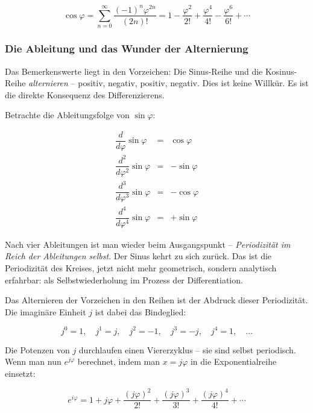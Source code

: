 ﻿\documentclass[a4paper,12pt]{article}
\theoremstyle{definition}
\begin{document}
\begin{equation}
	\cos\varphi = \sum_{n=0}^{\infty} \frac{(-1)^n \varphi^{2n}}{(2n)!}
	= 1 - \frac{\varphi^2}{2!} + \frac{\varphi^4}{4!} - \frac{\varphi^6}{6!} + \cdots
\end{equation}

\subsubsection{Die Ableitung und das Wunder der Alternierung}

Das Bemerkenswerte liegt in den Vorzeichen: Die Sinus-Reihe und die Kosinus-Reihe
\textit{alternieren} -- positiv, negativ, positiv, negativ. Dies ist keine
Willkür. Es ist die direkte Konsequenz des Differenzierens.

Betrachte die Ableitungsfolge von $\sin\varphi$:

\begin{equation}
	\begin{array}{rcl}
		\dfrac{d}{d\varphi}\sin\varphi  &=& \cos\varphi \\[6pt]
		\dfrac{d^2}{d\varphi^2}\sin\varphi &=& -\sin\varphi \\[6pt]
		\dfrac{d^3}{d\varphi^3}\sin\varphi &=& -\cos\varphi \\[6pt]
		\dfrac{d^4}{d\varphi^4}\sin\varphi &=& +\sin\varphi
	\end{array}
\end{equation}

Nach vier Ableitungen ist man wieder beim Ausgangspunkt -- \textit{Periodizität
	im Reich der Ableitungen selbst}. Der Sinus kehrt zu sich zurück. Das ist die
Periodizität des Kreises, jetzt nicht mehr geometrisch, sondern analytisch erfahrbar:
als Selbstwiederholung im Prozess der Differentiation.

Das Alternieren der Vorzeichen in den Reihen ist der Abdruck dieser Periodizität.
Die imaginäre Einheit $j$ ist dabei das Bindeglied:

\begin{equation}
	j^0 = 1, \quad j^1 = j, \quad j^2 = -1, \quad j^3 = -j, \quad j^4 = 1, \quad \ldots
\end{equation}

Die Potenzen von $j$ durchlaufen einen Viererzyklus -- sie sind selbst periodisch.
Wenn man nun $e^{j\varphi}$ berechnet, indem man $x = j\varphi$ in die
Exponentialreihe einsetzt:

\begin{equation}
	e^{i\varphi} = 1 + j\varphi + \frac{(j\varphi)^2}{2!} + \frac{(j\varphi)^3}{3!}
	+ \frac{(j\varphi)^4}{4!} + \cdots
\end{equation}
\end{document}
